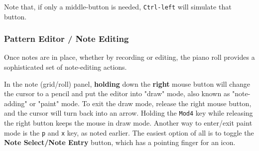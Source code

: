    Note that, if only a middle-button is needed,
   \texttt{Ctrl-left} will simulate that button.




\subsubsection{Pattern Editor / Note Editing}
\label{subsubsec:pattern_editor_note_editing}

   Once notes are in place, whether by recording or editing,
   the piano roll provides a sophisticated set of note-editing
   actions.

   \setcounter{ItemCounter}{0}      %

	In the note (grid/roll) panel, \textbf{holding}
	down the \textbf{right} mouse button will change the cursor
	to a pencil and put the editor into "draw" mode, 
   also known as "note-adding" or "paint" mode.
   To exit the draw mode, release the right mouse button, and the cursor will
   turn back into an arrow.
   Holding the \texttt{Mod4} key while releasing the right button keeps the
   mouse in draw mode.
   Another way to enter/exit paint mode is 
   the \texttt{p} and \texttt{x} key, as noted earlier.
   The easiest option of all is to toggle the
   \textbf{Note Select/Note Entry} button, which has a pointing finger for an
   icon.

